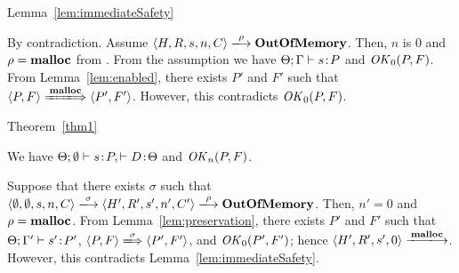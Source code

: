 \begin{pfof}{Lemma~\ref{lem:immediateSafety}}

By contradiction.  Assume \(\langle H, R, s, n, C \rangle
\xlongrightarrow{\rho} \OVERFLOW\). Then, \(n\) is \(0\) and \(\rho =
\mathbf{malloc}\) from .  From the assumption we have
\(\Theta;\Gamma \vdash s \!:\! P\) and \(\mathit{OK}_0(P, F)\).  From
Lemma~\ref{lem:enabled}, there exists \(P'\) and \(F'\) such that \(
\langle P, F \rangle \xLongrightarrow{\Malloc} \langle P', F'
\rangle\).  However, this contradicts \(\mathit{OK}_0(P, F)\).

\end{pfof}

\begin{pfof}{Theorem~\ref{thm1}}

We have \(\Theta;\emptyset \vdash s\!:\! P, \vdash D\!:\! \Theta\) and
\(\mathit{OK}_n(P, F)\).

Suppose that there exists \(\sigma\) such that \(\langle \emptyset,
\emptyset, s, n, C\rangle \xlongrightarrow{\sigma} \langle H', R', s',
n', C'\rangle \xlongrightarrow{\rho} \OVERFLOW\).  Then, \(n' = 0\)
and \(\rho = \mathbf{malloc}\).  From Lemma~\ref{lem:preservation}, there
exists \(P'\) and \(F'\) such that \(\Theta; \Gamma' \vdash s' \!:\!
P'\), \( \langle P, F \rangle \xLongrightarrow{\sigma} \langle P', F'
\rangle \), and \(\mathit{OK}_0(P', F')\); hence \(\langle H', R', s',
0\rangle \xlongrightarrow{\Malloc}\).  However, this contradicts
Lemma~\ref{lem:immediateSafety}.

\end{pfof}
